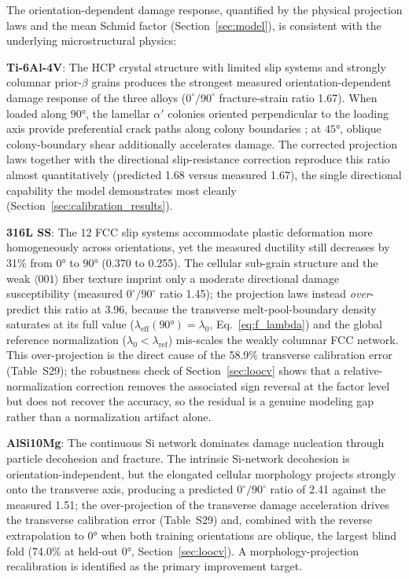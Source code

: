 The orientation-dependent damage response, quantified by the physical projection laws and the mean Schmid factor (Section~\ref{sec:model}), is consistent with the underlying microstructural physics:

\textbf{Ti-6Al-4V}: The HCP crystal structure with limited slip systems and strongly columnar prior-$\beta$ grains produces the strongest measured orientation-dependent damage response of the three alloys ($0^\circ/90^\circ$ fracture-strain ratio 1.67). When loaded along $\ang{90}$, the lamellar $\alpha'$ colonies oriented perpendicular to the loading axis provide preferential crack paths along colony boundaries \cite{carroll2015anisotropic}; at $\ang{45}$, oblique colony-boundary shear additionally accelerates damage. The corrected projection laws together with the directional slip-resistance correction reproduce this ratio almost quantitatively (predicted 1.68 versus measured 1.67), the single directional capability the model demonstrates most cleanly (Section~\ref{sec:calibration_results}).

\textbf{316L SS}: The 12 FCC slip systems accommodate plastic deformation more homogeneously across orientations, yet the measured ductility still decreases by 31\% from $\ang{0}$ to $\ang{90}$ (0.370 to 0.255). The cellular sub-grain structure and the weak $\langle001\rangle$ fiber texture imprint only a moderate directional damage susceptibility (measured $0^\circ/90^\circ$ ratio 1.45); the projection laws instead \emph{over}-predict this ratio at 3.96, because the transverse melt-pool-boundary density saturates at its full value ($\lambda_{\mathrm{eff}}(\ang{90})=\lambda_0$, Eq.~\eqref{eq:f_lambda}) and the global reference normalization ($\lambda_0<\lambda_{\mathrm{ref}}$) mis-scales the weakly columnar FCC network. This over-projection is the direct cause of the 58.9\% transverse calibration error (Table~S29); the robustness check of Section~\ref{sec:loocv} shows that a relative-normalization correction removes the associated sign reversal at the factor level but does not recover the accuracy, so the residual is a genuine modeling gap rather than a normalization artifact alone.

\textbf{AlSi10Mg}: The continuous Si network dominates damage nucleation through particle decohesion and fracture. The intrinsic Si-network decohesion is orientation-independent, but the elongated cellular morphology projects strongly onto the transverse axis, producing a predicted $0^\circ/90^\circ$ ratio of 2.41 against the measured 1.51; the over-projection of the transverse damage acceleration drives the transverse calibration error (Table~S29) and, combined with the reverse extrapolation to $\ang{0}$ when both training orientations are oblique, the largest blind fold (74.0\% at held-out $\ang{0}$, Section~\ref{sec:loocv}). A morphology-projection recalibration is identified as the primary improvement target.

